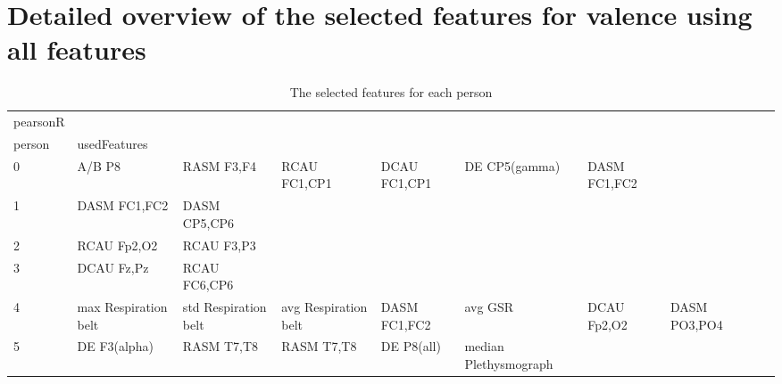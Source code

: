 \chapter{Detailed overview of the selected features for valence using all features}

\begin{landscape}
\begin{table}[]
\centering
\caption{The selected features for each person}
\begin{tabular}{l|llllllll}
pearsonR &                       &                       &                      &                         &                         &                      &                      &                       &                       &                    \\
person   & usedFeatures          &                       &                      &                         &                         &                      &                      &                       &                       &                    \\
0        & A/B P8                & RASM F3,F4            & RCAU FC1,CP1         & DCAU FC1,CP1            & DE CP5(gamma)           & DASM FC1,FC2         &                      &                       &                       &                    \\
1        & DASM FC1,FC2          & DASM CP5,CP6          &                      &                         &                         &                      &                      &                       &                       &                    \\
2        & RCAU Fp2,O2           & RCAU F3,P3            &                      &                         &                         &                      &                      &                       &                       &                    \\
3        & DCAU Fz,Pz            & RCAU FC6,CP6          &                      &                         &                         &                      &                      &                       &                       &                    \\
4        & max Respiration belt  & std Respiration belt  & avg Respiration belt & DASM FC1,FC2            & avg GSR                 & DCAU Fp2,O2          & DASM PO3,PO4         &                       &                       &                    \\
5        & DE F3(alpha)          & RASM T7,T8            & RASM T7,T8           & DE P8(all)              & median Plethysmograph   &                      &                      &                       &                       &                    \\

\end{tabular}
\end{table}
\end{landscape}
